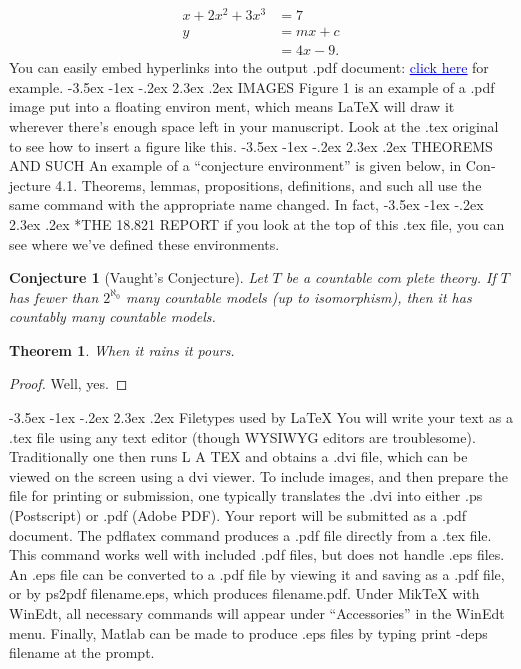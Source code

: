 \documentclass[leqno]{article}
\makeatletter
\newtheorem{conjecture}{Conjecture}[section]
\newtheorem{theorem}{Theorem}[section]
\renewcommand\section{\@startsection {section}{1}{\z@}%
	{-3.5ex \@plus -1ex \@minus -.2ex}%
	{2.3ex \@plus.2ex}%
	{\normalfont\Large}}
\makeatother
\begin{document}
\begin{align*}
x + 2x^2 + 3x^3 &= 7 \\
y &= mx + c \\
&= 4x - 9.
\end{align*}
You can easily embed hyperlinks into the output .pdf document:
\href{http://stellar.mit.edu/S/course/18/sp13/18.821/}{\textcolor{blue}{\underline{click here}}} for example.
\section{IMAGES}
Figure 1 is an example of a .pdf image put into a ﬂoating environ­
ment, which means LaTeX will draw it wherever there’s enough space
left in your manuscript. Look at the .tex original to see how to insert
a ﬁgure like this.
\section{THEOREMS AND SUCH}
An example of a “conjecture environment” is given below, in Con­
jecture 4.1. Theorems, lemmas, propositions, deﬁnitions, and such all
use the same command with the appropriate name changed. In fact,
\section*{THE 18.821 REPORT}
if you look at the top of this .tex ﬁle, you can see where we’ve deﬁned
these environments.
\begin{conjecture}[Vaught’s Conjecture]
Let $T$ be a countable com­
plete theory. If $T$ has fewer than $2^{\aleph_0}$  many countable models (up to
isomorphism), then it has countably many countable models.
\end{conjecture}
\begin{theorem} 
 When it rains it pours.
\end{theorem}
\begin{proof}
 Well, yes.
\end{proof}
\section{ Filetypes used by LaTeX}
	You will write your text as a .tex ﬁle using any text editor (though
	WYSIWYG editors are troublesome). Traditionally one then runs
	L A TEX and obtains a .dvi ﬁle, which can be viewed on the screen using a
	dvi viewer. To include images, and then prepare the ﬁle for printing or
	submission, one typically translates the .dvi into either .ps (Postscript)
	or .pdf (Adobe PDF).
	Your report will be submitted as a .pdf document. The pdflatex
	command produces a .pdf ﬁle directly from a .tex ﬁle. This command
	works well with included .pdf ﬁles, but does not handle .eps ﬁles.
	An .eps ﬁle can be converted to a .pdf ﬁle by viewing it and saving
	as a .pdf ﬁle, or by ps2pdf filename.eps, which produces
	filename.pdf. Under MikTeX with WinEdt, all necessary commands
	will appear under “Accessories” in the WinEdt menu.
	Finally, Matlab can be made to produce .eps ﬁles by typing
	print -deps filename
	at the prompt.
\end{document}
